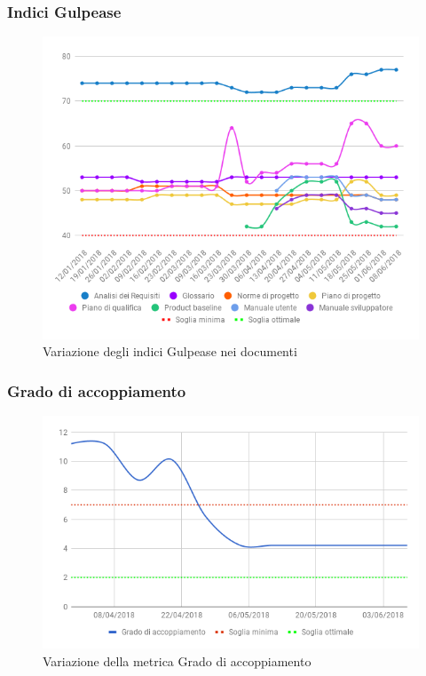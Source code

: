 		\subsubsection{Indici Gulpease}
		
		\begin{figure}[H]{\textwidth}
  			\centering
  			\includegraphics[width=1\linewidth]{./img/Risultati/Gulpease.png}
	  		\caption[Variazione indici Gulpease]{Variazione degli indici Gulpease nei documenti}
		\end{figure}
		
		\subsubsection{Grado di accoppiamento}
	
		\begin{figure}[H]{\textwidth}
  			\centering
  			\includegraphics[width=1\linewidth]{./img/Risultati/Coupling.png}
	  		\caption{Variazione della metrica Grado di accoppiamento}
		\end{figure}\\
		
